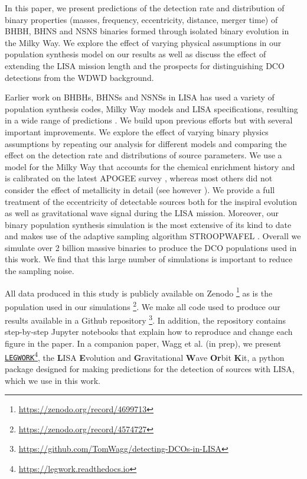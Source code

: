 In this paper, we present predictions of the detection rate and distribution of binary properties (masses, frequency, eccentricity, distance, merger time) of BHBH, BHNS and NSNS binaries formed through isolated binary evolution in the Milky Way. We explore the effect of varying physical assumptions in our population synthesis model on our results as well as discuss the effect of extending the LISA mission length and the prospects for distinguishing DCO detections from the WDWD background.

Earlier work on BHBHs, BHNSs and NSNSs in LISA has used a variety of population synthesis codes, Milky Way models and LISA specifications, resulting in a wide range of predictions \citep{Nelemans+2001,Liu+2009,Belczynski+2010,Liu+2014,Lamberts+2019,Lau+2020,Breivik+2020,Sesana+2020}. We build upon previous efforts but with several important improvements. We explore the effect of varying binary physics assumptions by repeating our analysis for \nModels{} different models and comparing the effect on the detection rate and distributions of source parameters. We use a model for the Milky Way that accounts for the chemical enrichment history and is calibrated on the latest APOGEE survey \citep{Majewski+2017,Frankel+2018}, whereas most others did not consider the effect of metallicity in detail (see however \citealp{Lamberts+2019, Sesana+2020}). We provide a full treatment of the eccentricity of detectable sources both for the inspiral evolution as well as gravitational wave signal during the LISA mission. Moreover, our binary population synthesis simulation is the most extensive of its kind to date and makes use of the adaptive sampling algorithm STROOPWAFEL \citep{Broekgaarden+2019, Broekgaarden+2021}. Overall we simulate over 2 billion massive binaries to produce the DCO populations used in this work. We find that this large number of simulations is important to reduce the sampling noise.

All data produced in this study is publicly available on Zenodo \href{https://zenodo.org/record/4699713}{\faFileCode}\footnote{\url{https://zenodo.org/record/4699713}} as is the population used in our simulations \href{https://zenodo.org/record/4574727}{\faFileCode}\footnote{\url{https://zenodo.org/record/4574727}}. We make all code used to produce our results available in a Github repository \href{https://github.com/TomWagg/detecting-DCOs-in-LISA}{\faGithub}\footnote{\url{https://github.com/TomWagg/detecting-DCOs-in-LISA}}. In addition, the repository contains step-by-step Jupyter notebooks that explain how to reproduce and change each figure in the paper. In a companion paper, Wagg et al. (in prep), we present \href{https://legwork.readthedocs.io}{\texttt{LEGWORK}}\footnote{\url{https://legwork.readthedocs.io}}, the \textbf{L}ISA \textbf{E}volution and \textbf{G}ravitational \textbf{W}ave \textbf{Or}bit \textbf{K}it, a python package designed for making predictions for the detection of sources with LISA, which we use in this work.

